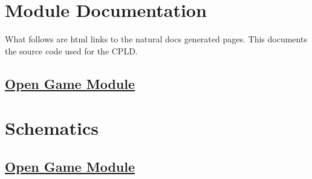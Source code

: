 \documentclass{article}
\begin{document}
  

  \section{Module Documentation}
  \par What follows are html links to the natural docs generated pages. This documents
  the source code used for the CPLD.

  \subsection{\href{../files/open_game_module-v.html}{Open Game Module}}

  \section{Schematics}

  \subsection{\href{../../../schematic/open_game_module.pdf}{Open Game Module}}
\end{document}
